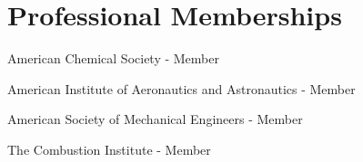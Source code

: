 \begin{lonelist}
\end{lonelist}

\section{{\sectionfont Professional Memberships}}
American Chemical Society - Member

American Institute of Aeronautics and Astronautics - Member

American Society of Mechanical Engineers - Member

The Combustion Institute - Member



